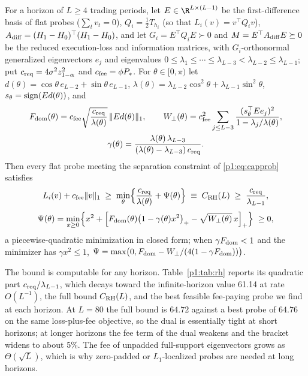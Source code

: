\begin{theorem}\label{p1:thm:rh}
For a horizon of $L\ge4$ trading periods, let $E\in\R^{L\times(L-1)}$ be the first-difference basis of flat probes ($\sum_tv_t=0$), $Q_i=\tfrac12T_{h_i}$ (so that $L_i(v)=v^\top Q_iv$), $A_{\rm diff}=(H_1-H_0)^\top(H_1-H_0)$, and let $G_i=E^\top Q_iE\succ0$ and $M=E^\top A_{\rm diff}E\succeq0$ be the reduced execution-loss and information matrices, with $G_i$-orthonormal generalized eigenvectors $e_j$ and eigenvalues $0\le\lambda_1\le\cdots\le\lambda_{L-3}<\lambda_{L-2}\le\lambda_{L-1}$; put $c_{\rm req}=4\sigma^2z_{1-\alpha}^2$ and $c_{\rm fee}=\phi P_*$. For $\theta\in[0,\pi)$ let $d(\theta)=\cos\theta\,e_{L-2}+\sin\theta\,e_{L-1}$, $\lambda(\theta)=\lambda_{L-2}\cos^2\theta+\lambda_{L-1}\sin^2\theta$, $s_\theta={\rm sign}(Ed(\theta))$, and
\begin{equation}\label{p1:eq:rhdefs}
\begin{gathered}
F_{\rm dom}(\theta)=c_{\rm fee}\sqrt{\frac{c_{\rm req}}{\lambda(\theta)}}\,\|Ed(\theta)\|_1,\qquad W_\perp(\theta)=c_{\rm fee}^2\sum_{j\le L-3}\frac{(s_\theta^\top Ee_j)^2}{1-\lambda_j/\lambda(\theta)},\\
\gamma(\theta)=\frac{\lambda(\theta)\,\lambda_{L-3}}{(\lambda(\theta)-\lambda_{L-3})\,c_{\rm req}} .
\end{gathered}
\end{equation}
Then every flat probe meeting the separation constraint of \eqref{p1:eq:capprob} satisfies
\begin{equation}\label{p1:eq:rh}
L_i(v)+c_{\rm fee}\|v\|_1\;\ge\;\min_{\theta}\Bigl\{\frac{c_{\rm req}}{\lambda(\theta)}+\Psi(\theta)\Bigr\}\;\equiv\;C_{\rm RH}(L)\;\ge\;\frac{c_{\rm req}}{\lambda_{L-1}},
\end{equation}
\[
\Psi(\theta)=\min_{x\ge0}\Bigl\{x^2+\Bigl[F_{\rm dom}(\theta)\bigl(1-\gamma(\theta)x^2\bigr)_+-\sqrt{W_\perp(\theta)}\,x\Bigr]_+\Bigr\}\;\ge0 ,
\]
a piecewise-quadratic minimization in closed form; when $\gamma F_{\rm dom}<1$ and the minimizer has $\gamma x^2\le1$, $\Psi=\max\bigl(0,F_{\rm dom}-W_\perp/(4(1-\gamma F_{\rm dom}))\bigr)$.
\end{theorem}

The bound is computable for any horizon. Table~\ref{p1:tab:rh} reports its quadratic part $c_{\rm req}/\lambda_{L-1}$, which decays toward the infinite-horizon value 61.14 at rate $O(L^{-1})$, the full bound $C_{\rm RH}(L)$, and the best feasible fee-paying probe we find at each horizon. At $L=80$ the full bound is $64.72$ against a best probe of $64.76$ on the same loss-plus-fee objective, so the dual is essentially tight at short horizons; at longer horizons the fee term of the dual weakens and the bracket widens to about 5\%. The fee of unpadded full-support eigenvectors grows as $\Theta(\sqrt L)$, which is why zero-padded or $L_1$-localized probes are needed at long horizons.

